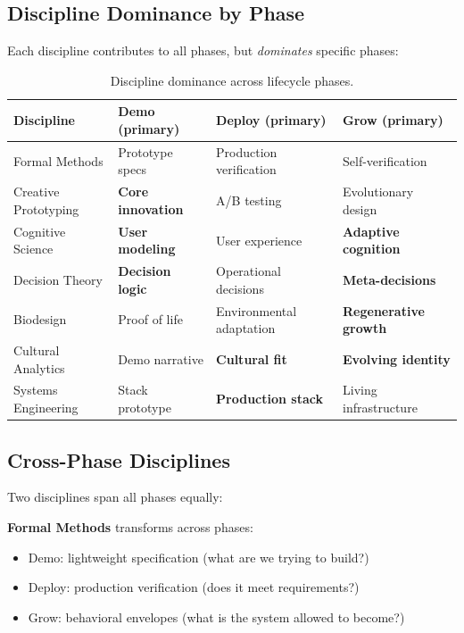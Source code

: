 \documentclass[11pt,a4paper]{article}
\begin{document}
\subsection{Discipline Dominance by Phase}

Each discipline contributes to all phases, but \emph{dominates} specific phases:

\begin{table}[htbp]
\centering
\begin{tabular}{>{\raggedright\arraybackslash}p{3.2cm} p{3.2cm} p{3.2cm} p{3.2cm}}
\toprule
\textbf{Discipline} & \textbf{Demo (primary)} & \textbf{Deploy (primary)} & \textbf{Grow (primary)} \\
\midrule
Formal Methods & Prototype specs & Production verification & Self-verification \\
Creative Prototyping & \textbf{Core innovation} & A/B testing & Evolutionary design \\
Cognitive Science & \textbf{User modeling} & User experience & \textbf{Adaptive cognition} \\
Decision Theory & \textbf{Decision logic} & Operational decisions & \textbf{Meta-decisions} \\
Biodesign & Proof of life & Environmental adaptation & \textbf{Regenerative growth} \\
Cultural Analytics & Demo narrative & \textbf{Cultural fit} & \textbf{Evolving identity} \\
Systems Engineering & Stack prototype & \textbf{Production stack} & Living infrastructure \\
\bottomrule
\end{tabular}
\caption{Discipline dominance across lifecycle phases.}
\label{tab:discipline-dominance}
\end{table}

\subsection{Cross-Phase Disciplines}

Two disciplines span all phases equally:

\textbf{Formal Methods} transforms across phases:
\begin{itemize}[nosep]
    \item Demo: lightweight specification (what are we trying to build?)
    \item Deploy: production verification (does it meet requirements?)
    \item Grow: behavioral envelopes (what is the system allowed to become?)
\end{itemize}
\end{document}
